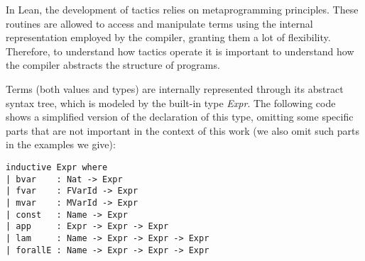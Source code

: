 In Lean, the development of tactics relies on metaprogramming principles. These routines are allowed to access and manipulate terms using the internal representation employed by the compiler, granting them a lot of flexibility. Therefore, to understand how tactics operate it is important to understand how the compiler abstracts the structure of programs.

Terms (both values and types) are internally represented through its abstract syntax tree, which is modeled by the built-in type \textit{Expr}. The following code shows a simplified version of the declaration of this type, omitting some specific parts that are not important in the context of this work (we also omit such parts in the examples we give):

\begin{verbatim}
inductive Expr where
| bvar    : Nat -> Expr
| fvar    : FVarId -> Expr
| mvar    : MVarId -> Expr
| const   : Name -> Expr
| app     : Expr -> Expr -> Expr
| lam     : Name -> Expr -> Expr -> Expr
| forallE : Name -> Expr -> Expr -> Expr
\end{verbatim}

